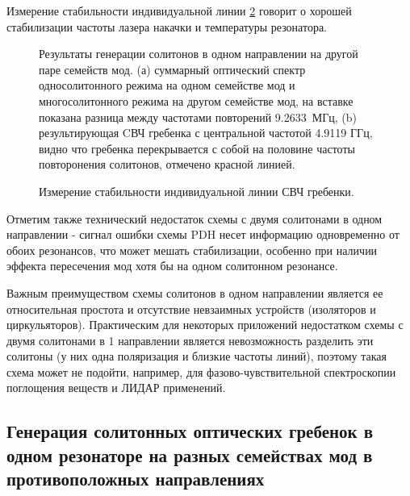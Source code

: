 Измерение стабильности индивидуальной линии \ref{single_line_stability_cp} говорит о хорошей стабилизации частоты лазера накачки и температуры резонатора.

\begin{figure}[ht]
\begin{minipage}[ht]{1\linewidth}
\end{minipage}
\caption{Результаты генерации солитонов в одном направлении на другой паре семейств мод. (а) суммарный оптический спектр односолитонного режима на одном семействе мод и многосолитонного режима на другом семействе мод, на вставке показана разница между частотами повторений 9.2633~МГц, (b) результирующая CВЧ гребенка с центральной частотой 4.9119 ГГц, видно что гребенка перекрывается с собой на половине частоты повторонения солитонов, отмечено красной линией.}
\label{coscheme_different_types}
\end{figure}

\begin{figure}[ht]
\begin{minipage}[ht]{1\linewidth}
\end{minipage}
\caption{Измерение стабильности индивидуальной линии СВЧ гребенки.}
\label{single_line_stability_cp}
\end{figure}

Отметим также технический недостаток схемы с двумя солитонами в одном направлении - сигнал ошибки схемы PDH несет информацию одновременно от обоих резонансов, что может мешать стабилизации, особенно при наличии эффекта пересечения мод хотя бы на одном солитонном резонансе.

Важным преимуществом схемы солитонов в одном направлении является ее относительная простота и отсутствие невзаимных устройств (изоляторов и циркульяторов). Практическим для некоторых приложений недостатком схемы с двумя солитонами в 1 направлении является невозможность разделить эти солитоны (у них одна поляризация и близкие частоты линий), поэтому такая схема может не подойти, например, для фазово-чувствительной спектроскопии поглощения веществ и ЛИДАР применений.



\subsection{Генерация солитонных оптических гребенок в одном резонаторе на разных семействах мод в противоположных направлениях}


